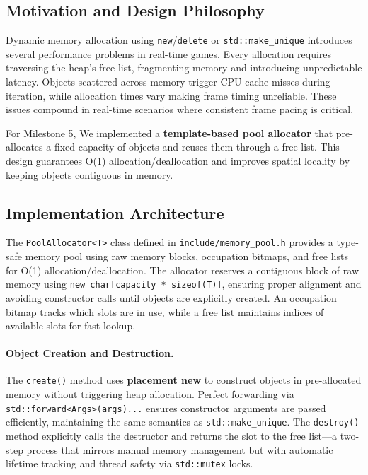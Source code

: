 \documentclass[12pt]{article}
\begin{document}
\subsection{Motivation and Design Philosophy}

Dynamic memory allocation using \texttt{new}/\texttt{delete} or \texttt{std::make\_unique} introduces several performance problems in real-time games. Every allocation requires traversing the heap's free list, fragmenting memory and introducing unpredictable latency. Objects scattered across memory trigger CPU cache misses during iteration, while allocation times vary making frame timing unreliable. These issues compound in real-time scenarios where consistent frame pacing is critical.

For Milestone 5, We implemented a \textbf{template-based pool allocator} that pre-allocates a fixed capacity of objects and reuses them through a free list. This design guarantees O(1) allocation/deallocation and improves spatial locality by keeping objects contiguous in memory.

\subsection{Implementation Architecture}

The \texttt{PoolAllocator<T>} class defined in \texttt{include/memory\_pool.h} provides a type-safe memory pool using raw memory blocks, occupation bitmaps, and free lists for O(1) allocation/deallocation. The allocator reserves a contiguous block of raw memory using \texttt{new char[capacity * sizeof(T)]}, ensuring proper alignment and avoiding constructor calls until objects are explicitly created. An occupation bitmap tracks which slots are in use, while a free list maintains indices of available slots for fast lookup.

\paragraph{Object Creation and Destruction.}
The \texttt{create()} method uses \textbf{placement new} to construct objects in pre-allocated memory without triggering heap allocation. Perfect forwarding via \texttt{std::forward<Args>(args)...} ensures constructor arguments are passed efficiently, maintaining the same semantics as \texttt{std::make\_unique}. The \texttt{destroy()} method explicitly calls the destructor and returns the slot to the free list—a two-step process that mirrors manual memory management but with automatic lifetime tracking and thread safety via \texttt{std::mutex} locks.
\end{document}
